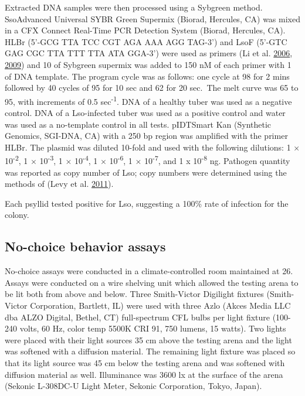 \documentclass[]{article}
\begin{document}
Extracted DNA samples were then processed using a Sybgreen method.
SsoAdvanced Universal SYBR Green Supermix (Biorad, Hercules, CA) was
mixed in a CFX Connect Real-Time PCR Detection System (Biorad, Hercules,
CA). HLBr (5'-GCG TTA TCC CGT AGA AAA AGG TAG-3') and LsoF (5'-GTC GAG
CGC TTA TTT TTA ATA GGA-3') were used as primers (Li et al.
\protect\hyperlink{ref-Li2006}{2006},
\protect\hyperlink{ref-Li2009}{2009}) and 10 of Sybgreen supermix was
added to 150 nM of each primer with 1 of DNA template. The program cycle
was as follows: one cycle at 98 for 2 mins followed by 40 cycles of 95
for 10 sec and 62 for 20 sec.~The melt curve was 65 to 95, with
increments of 0.5 sec\textsuperscript{-1}. DNA of a healthy tuber was
used as a negative control. DNA of a Lso-infected tuber was used as a
positive control and water was used as a no-template control in all
tests. pIDTSmart Kan (Synthetic Genomics, SGI-DNA, CA) with a 250 bp
region was amplified with the primer HLBr. The plasmid was diluted
10-fold and used with the following dilutions: 1 \(\times\)
10\textsuperscript{-2}, 1 \(\times\) 10\textsuperscript{-3}, 1
\(\times\) 10\textsuperscript{-4}, 1 \(\times\) 10\textsuperscript{-6},
1 \(\times\) 10\textsuperscript{-7}, and 1 x 10\textsuperscript{-8} ng.
Pathogen quantity was reported as copy number of Lso; copy numbers were
determined using the methods of (Levy et al.
\protect\hyperlink{ref-Levy2011}{2011}).

Each psyllid tested positive for Lso, suggesting a 100\% rate of
infection for the colony.

\hypertarget{sec:no-choice}{%
\subsection{No-choice behavior assays}\label{sec:no-choice}}

No-choice assays were conducted in a climate-controlled room maintained
at 26. Assays were conducted on a wire shelving unit which allowed the
testing arena to be lit both from above and below. Three Smith-Victor
Digilight fixtures (Smith-Victor Corporation, Bartlett, IL) were used
with three Azlo (Akces Media LLC dba ALZO Digital, Bethel, CT)
full-spectrum CFL bulbs per light fixture (100-240 volts, 60 Hz, color
temp 5500K CRI 91, 750 lumens, 15 watts). Two lights were placed with
their light sources 35 cm above the testing arena and the light was
softened with a diffusion material. The remaining light fixture was
placed so that its light source was 45 cm below the testing arena and
was softened with diffusion material as well. Illuminance was 3600 lx at
the surface of the arena (Sekonic L-308DC-U Light Meter, Sekonic
Corporation, Tokyo, Japan).
\end{document}
